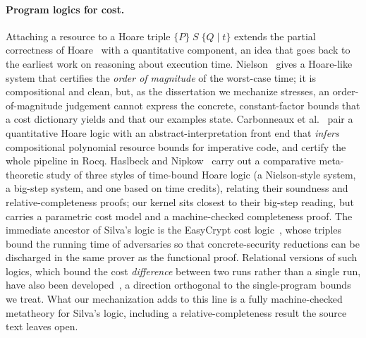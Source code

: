\documentclass[runningheads]{llncs}
\newcommand{\triple}[4]{\{#1\}\;#2\;\{#3 \mid #4\}}
\begin{document}
\paragraph{Program logics for cost.}
Attaching a resource to a Hoare triple $\triple{P}{S}{Q}{t}$ extends the partial
correctness of Hoare~\cite{Hoare1969} with a quantitative component, an idea that
goes back to the earliest work on reasoning about execution time.
Nielson~\cite{Nielson1987} gives a Hoare-like system that certifies the
\emph{order of magnitude} of the worst-case time; it is compositional and clean,
but, as the dissertation we mechanize stresses, an order-of-magnitude judgement
cannot express the concrete, constant-factor bounds that a cost dictionary yields
and that our examples state.
Carbonneaux et al.~\cite{CarbonneauxHoffmannShao2015} pair a quantitative Hoare
logic with an abstract-interpretation front end that \emph{infers} compositional
polynomial resource bounds for imperative code, and certify the whole pipeline in
Rocq.
Haslbeck and Nipkow~\cite{HaslbeckNipkow2018} carry out a comparative
meta-theoretic study of three styles of time-bound Hoare logic (a Nielson-style
system, a big-step system, and one based on time credits), relating their
soundness and relative-completeness proofs; our kernel sits closest to their
big-step reading, but carries a parametric cost model and a machine-checked
completeness proof.
The immediate ancestor of Silva's logic is the EasyCrypt cost
logic~\cite{Barbosa2021}, whose triples bound the running time of adversaries so
that concrete-security reductions can be discharged in the same prover as the
functional proof.
Relational versions of such logics, which bound the cost \emph{difference} between
two runs rather than a single run, have also been
developed~\cite{Cicek2017}, a direction orthogonal to the single-program bounds we
treat.
What our mechanization adds to this line is a fully machine-checked metatheory for
Silva's logic, including a relative-completeness result the source text leaves
open.
\end{document}
